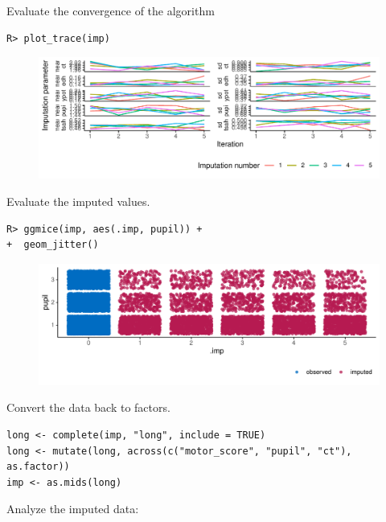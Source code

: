 \documentclass[
  article]{jss}
\begin{document}
Evaluate the convergence of the algorithm

\begin{verbatim}
R> plot_trace(imp)
\end{verbatim}

\begin{figure}[h]

{\centering \includegraphics{manuscript_files/figure-pdf/unnamed-chunk-40-1.pdf}

}

\end{figure}

Evaluate the imputed values.

\begin{verbatim}
R> ggmice(imp, aes(.imp, pupil)) +
+  geom_jitter()
\end{verbatim}

\begin{figure}[h]

{\centering \includegraphics{manuscript_files/figure-pdf/unnamed-chunk-41-1.pdf}

}

\end{figure}

Convert the data back to factors.

\begin{verbatim}
long <- complete(imp, "long", include = TRUE)
long <- mutate(long, across(c("motor_score", "pupil", "ct"), as.factor))
imp <- as.mids(long)
\end{verbatim}

Analyze the imputed data:
\end{document}
